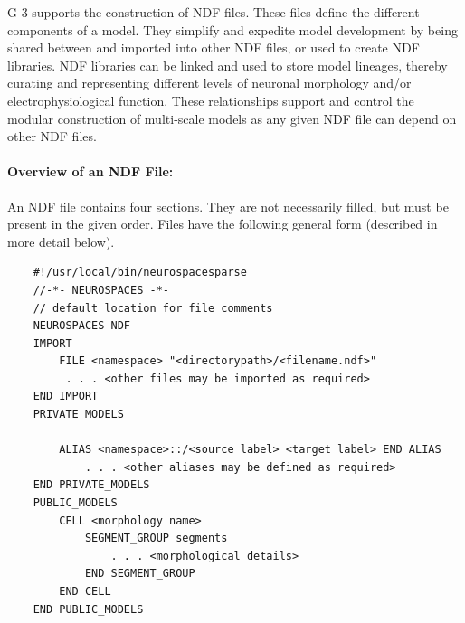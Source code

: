 \documentclass[11pt,3p,twocolumn]{JMN}
\begin{document}
G-3 supports the construction of NDF files. These files define the different components of a model.  They simplify and expedite model development by being shared between and imported into other NDF files, or used to create NDF libraries. NDF libraries can be linked and used to store model lineages, thereby curating and representing different levels of neuronal morphology and/or electrophysiological function.
These relationships support and control the modular construction of multi-scale
models as any given NDF file can depend on other NDF files.

\paragraph{Overview of an NDF File:}
\label{sec:overview-ndf-file}
An NDF file contains four sections. They are not necessarily filled, but must be present in the given order.  Files have the following general form (described in more detail below).

\begin{center}
 \begin{tiny}
\begin{verbatim}
    #!/usr/local/bin/neurospacesparse
    //-*- NEUROSPACES -*-
    // default location for file comments
    NEUROSPACES NDF
    IMPORT
        FILE <namespace> "<directorypath>/<filename.ndf>"
         . . . <other files may be imported as required>
    END IMPORT
    PRIVATE_MODELS
    
        ALIAS <namespace>::/<source label> <target label> END ALIAS
            . . . <other aliases may be defined as required>
    END PRIVATE_MODELS
    PUBLIC_MODELS
        CELL <morphology name>
            SEGMENT_GROUP segments
                . . . <morphological details>
            END SEGMENT_GROUP
        END CELL
    END PUBLIC_MODELS
\end{verbatim}
\end{tiny}
\end{center}
\end{document}
